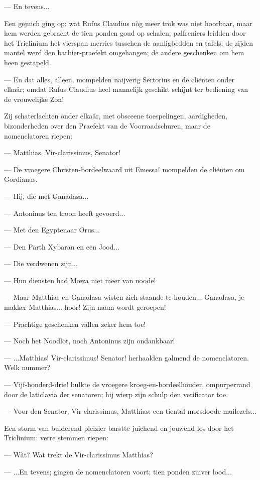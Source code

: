 \documentclass[a4paper, 12pt, oneside, dutch]{article}
\begin{document}
--- En tevens...

Een gejuich ging op: wat Rufus Claudius nòg meer trok was niet hoorbaar, maar hem werden gebracht de tien ponden goud op schalen; palfreniers leidden door het Triclinium het vierspan merries tusschen de aanligbedden en tafels; de zijden mantel werd den barbier-praefekt omgehangen; de andere geschenken om hem heen gestapeld.

--- En dat alles, alleen, mompelden naijverig Sertorius en de cliënten onder elkaâr; omdat Rufus Claudius heel mannelijk geschikt schijnt ter bediening van de vrouwelijke Zon!

Zij schaterlachten onder elkaâr, met obsceene toespelingen, aardigheden, bizonderheden over den Praefekt van de Voorraadschuren, maar de nomenclatoren riepen:

--- Matthias, Vir-clarissimus, Senator!

--- De vroegere Christen-bordeelwaard uit Emessa! mompelden de cliënten om Gordianus.

--- Hij, die met Ganadasa...

--- Antoninus ten troon heeft gevoerd...

--- Met den Egyptenaar Orus...

--- Den Parth Xybaran en een Jood...

--- Die verdwenen zijn...

--- Hun diensten had Mœza niet meer van noode!

--- Maar Matthias en Ganadasa wisten zich staande te houden... Ganadasa, je makker Matthias... hoor! Zijn naam wordt geroepen!

--- Prachtige geschenken vallen zeker hem toe!

--- Noch het Noodlot, noch Antoninus zijn ondankbaar!

--- ...Matthias! Vir-clarissimus! Senator! herhaalden galmend de nomenclatoren. Welk nummer?

--- Vijf-honderd-drie! bulkte de vroegere kroeg-en-bordeelhouder, ompurperrand door de laticlavia der senatoren; hij wierp zijn schulp den verificator toe.

--- Voor den Senator, Vir-clarissimus, Matthias: een tiental morsdoode muilezels...

Een storm van bulderend pleizier barstte juichend en jouwend los door het Triclinium: verre stemmen riepen:

--- Wàt? Wat trekt de Vir-clarissimus Matthias?

--- ...En tevens; gingen de nomenclatoren voort; tien ponden zuiver lood...
\end{document}
